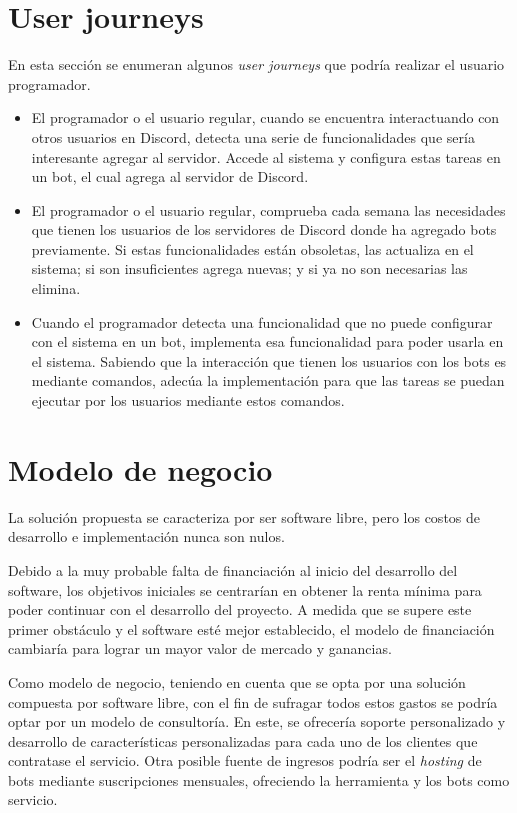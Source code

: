 \section{User journeys}

En esta sección se enumeran algunos \textit{user journeys} que podría realizar el usuario programador.

\begin{itemize}
	\item El programador o el usuario regular, cuando se encuentra interactuando con otros usuarios en Discord, detecta una serie de funcionalidades que sería interesante agregar al servidor. Accede al sistema y configura estas tareas en un bot, el cual agrega al servidor de Discord.
	\item El programador o el usuario regular, comprueba cada semana las necesidades que tienen los usuarios de los servidores de Discord donde ha agregado bots previamente. Si estas funcionalidades están obsoletas, las actualiza en el sistema; si son insuficientes agrega nuevas; y si ya no son necesarias las elimina.
	\item Cuando el programador detecta una funcionalidad que no puede configurar con el sistema en un bot, implementa esa funcionalidad para poder usarla en el sistema. Sabiendo que la interacción que tienen los usuarios con los bots es mediante comandos, adecúa la implementación para que las tareas se puedan ejecutar por los usuarios mediante estos comandos.
\end{itemize}


\section{Modelo de negocio}

La solución propuesta se caracteriza por ser software libre, pero los costos de desarrollo e implementación nunca son nulos.

Debido a la muy probable falta de financiación al inicio del desarrollo del software, los objetivos iniciales se centrarían en obtener la renta mínima para poder continuar con el desarrollo del proyecto. A medida que se supere este primer obstáculo y el software esté mejor establecido, el modelo de financiación cambiaría para lograr un mayor valor de mercado y ganancias.

Como modelo de negocio, teniendo en cuenta que se opta por una solución compuesta por software libre, con el fin de sufragar todos estos gastos se podría optar por un modelo de consultoría. En este, se ofrecería soporte personalizado y desarrollo de características personalizadas para cada uno de los clientes que contratase el servicio. Otra posible fuente de ingresos podría ser el \textit{hosting} de bots mediante suscripciones mensuales, ofreciendo la herramienta y los bots como servicio.

